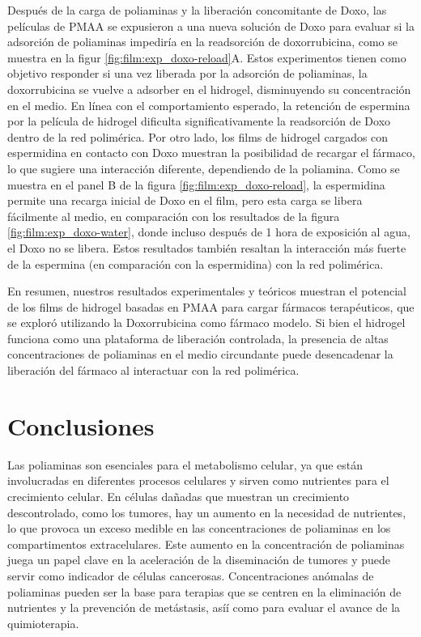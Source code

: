 Despu\'es de la carga de poliaminas y la liberaci\'on concomitante de Doxo, las pel\'iculas de PMAA se expusieron a una nueva soluci\'on de Doxo para evaluar si la adsorci\'on de poliaminas impedir\'ia en la readsorci\'on de doxorrubicina, como se muestra en la figur \ref{fig:film:exp_doxo-reload}A. Estos experimentos tienen como objetivo responder si una vez liberada por la adsorci\'on de poliaminas, la doxorrubicina se vuelve a adsorber en el hidrogel, disminuyendo su concentraci\'on en el medio. En l\'inea con el comportamiento esperado, la retenci\'on de espermina por la pel\'icula de hidrogel dificulta significativamente la readsorci\'on de Doxo dentro de la red polim\'erica. Por otro lado, los films de hidrogel cargados con espermidina en contacto con Doxo muestran la posibilidad de recargar el f\'armaco, lo que sugiere una interacci\'on diferente, dependiendo de la poliamina. Como se muestra en el panel B de la figura \ref{fig:film:exp_doxo-reload}, la espermidina permite una recarga inicial de Doxo en el film, pero esta carga se libera f\'acilmente al medio, en comparaci\'on con los resultados de la figura \ref{fig:film:exp_doxo-water}, donde incluso despu\'es de 1 hora de exposici\'on al agua, el Doxo no se libera. Estos resultados tambi\'en resaltan la interacci\'on m\'as fuerte de la espermina (en comparaci\'on con la espermidina) con la red polim\'erica.

En resumen, nuestros resultados experimentales y te\'oricos muestran el potencial de los films de hidrogel basadas en PMAA para cargar f\'armacos terap\'euticos, que se explor\'o utilizando la Doxorrubicina como f\'armaco modelo. Si bien el hidrogel funciona como una plataforma de liberaci\'on controlada, la presencia de altas concentraciones de poliaminas en el medio circundante puede desencadenar la liberaci\'on del f\'armaco al interactuar con la red polim\'erica.



\section{Conclusiones}

Las poliaminas son esenciales para el metabolismo celular, ya que est\'an involucradas en diferentes procesos celulares y sirven como nutrientes para el crecimiento celular. En c\'elulas da\~nadas que muestran un crecimiento descontrolado, como los tumores, hay un aumento en la necesidad de nutrientes, lo que provoca un exceso medible en las concentraciones de poliaminas en los compartimentos extracelulares. Este aumento en la concentraci\'on de poliaminas juega un papel clave en la aceleraci\'on de la diseminaci\'on de tumores y puede servir como indicador de c\'elulas cancerosas. Concentraciones an\'omalas de poliaminas pueden ser la base para terapias que se centren en la eliminaci\'on de nutrientes y la prevenci\'on de met\'astasis, así\'i como para evaluar el avance de la quimioterapia.

